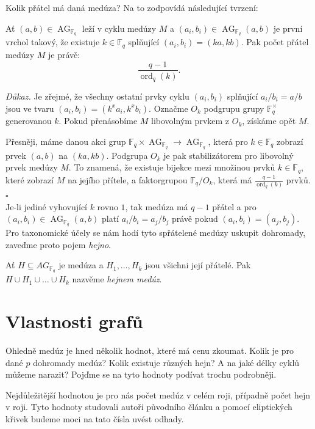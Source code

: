 \documentclass[12pt]{report}
\DeclareMathOperator{\ord}{ord}
\DeclareMathOperator{\AG}{AG}
\begin{document}
Kolik přátel má daná medúza? Na to zodpovídá následující tvrzení:
\begin{veta}\label{isom}
Ať $(a,b) \in \AG_{\mathbb{F}_q}$ leží v cyklu medúzy $M$ a $(a_i,b_i) \in \AG_{\mathbb{F}_q}(a,b)$ je první vrchol takový, že existuje $k \in \mathbb{F}_q$ splňující $(a_i,b_i) = (ka, kb)$. Pak počet přátel medúzy $M$ je právě:
$$\frac{q-1}{\ord_q (k)}.$$
\end{veta}

\noindent \textit{Důkaz.} Je zřejmé, že všechny ostatní prvky cyklu $(a_i,b_i)$ splňující $a_i/b_i = a/b$ jsou ve tvaru $(a_i,b_i) = (k^x a_i, k^x b_i)$. Označme $O_k$ podgrupu grupy $\mathbb{F}_q ^{\times}$ generovanou $k$. Pokud přenásobíme $M$ libovolným prvkem z $O_k$, získáme opět $M$.

Přesněji, máme danou akci grup $\mathbb{F}_q \times \AG_{\mathbb{F}_q} \longrightarrow \AG_{\mathbb{F}_q}$, která pro $k \in \mathbb{F}_q$ zobrazí prvek $(a,b)$ na $(ka,kb)$. Podgrupa $O_k$ je pak stabilizátorem pro libovolný prvek medúzy $M$. To znamená, že existuje bijekce mezi množinou prvků $k \in \mathbb{F}_q$, které zobrazí $M$ na jejího přítele, a faktorgrupou $\mathbb{F}_q/O_k$, která má $\frac{q-1}{\ord_q (k)}$ prvků. \hfill $\square$\\

Je-li jediné vyhovující $k$ rovno $1$, tak medúza má $q-1$ přátel a pro $(a_i,b_i) \in \AG_{\mathbb{F}_q}(a,b)$ platí $a_i/b_i = a_j/b_j$ právě pokud $(a_i,b_i) = (a_j,b_j)$. Pro taxonomické účely se nám hodí tyto spřátelené medúzy uskupit dohromady, zaveďme proto pojem \textit{hejno}.
\begin{definice}
Ať $H \subseteq AG_{\mathbb{F}_q}$ je medúza a $H_1,\dots,H_k$ jsou všichni její přátelé. Pak $H \cup H_1 \cup \dots \cup H_k$ nazvěme \textit{hejnem medúz}.
\end{definice}
 
 
\section{Vlastnosti grafů}

Ohledně medúz je hned několik hodnot, které má cenu zkoumat. Kolik je pro dané $p$ dohromady medúz? Kolik existuje různých hejn? A na jaké délky cyklů můžeme narazit? Pojďme se na tyto hodnoty podívat trochu podrobněji.

Nejdůležitější hodnotou je pro nás počet medúz v celém roji, případně počet hejn v roji. Tyto hodnoty studovali autoři původního článku \cite{Meduza} a pomocí eliptických křivek budeme moci na tato čísla uvést odhady.
\end{document}
